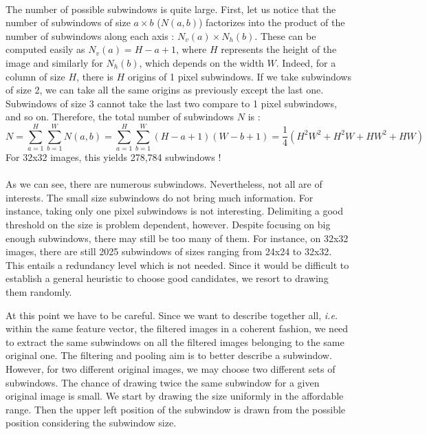 \documentclass[a4paper]{report}
\newlength{\larg}
\begin{document}
		\paragraph{}
		The number of possible subwindows is quite large. %
		First, let us notice that the number of subwindows of size $a \times b$ ($N(a,b)$) factorizes into the product of the number of subwindows along each axis : $N_v(a) \times N_h(b)$. These can be computed easily as $N_v(a) = H - a + 1$, where $H$ represents the height of the image and similarly for $N_h(b)$, which depends on the width $W$. Indeed, for a column of size $H$, there is $H$ origins of 1 pixel subwindows. If we take subwindows of size 2, we can take all the same origins as previously except the last one. Subwindows of size 3 cannot take the last two compare to 1 pixel subwindows, and so on.
		Therefore, the total number of subwindows $N$ is :
		\[
			N = \sum_{a=1}^H \sum_{b=1}^W N(a,b) = \sum_{a=1}^H \sum_{b=1}^W (H-a+1)(W-b+1) = \frac{1}{4}(H^2W^2 + H^2 W + H W^2 + HW)
		\]
		For 32x32 images, this yields 278,784 subwindows !
		
		\paragraph{}
		As we can see, there are numerous subwindows. Nevertheless, not all are of interests. The small size subwindows do not bring much information. For instance, taking only one pixel subwindows is not interesting. Delimiting a good threshold on the size is problem dependent, however. Despite focusing on big enough subwindows, there may still be too many of them. For instance, on 32x32 images, there are still 2025 subwindows of sizes ranging from 24x24 to 32x32. This entails a redundancy level which is not needed.
		Since it would be difficult to establish a general heuristic to choose good candidates, we resort to drawing them randomly. 
		\par
		At this point we have to be careful. Since we want to describe together all, \textit{i.e.} within the same feature vector, the filtered images in a coherent fashion, we need to extract the same subwindows on all the filtered images belonging to the same original one. The filtering and pooling aim is to better describe a subwindow. However, for two different original images, we may choose two different sets of subwindows.
		The chance of drawing twice the same subwindow for a given original image is small.
		We start by drawing the size uniformly in the affordable range. Then the upper left position of the subwindow is drawn from the possible position considering the subwindow size.
		
\end{document}
